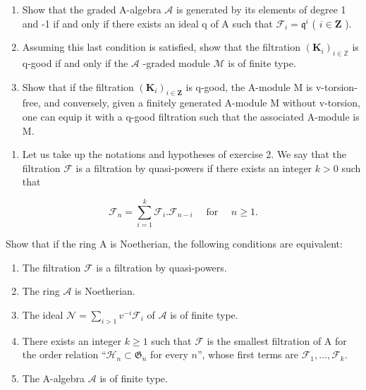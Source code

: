 \begin{enumerate}
\def\labelenumi{\alph{enumi})}
\setcounter{enumi}{1}
\item
  Show that the graded A-algebra \(\mathcal{A}\) is generated by its elements of degree 1 and -1 if and only if there exists an ideal q of A such that \(\mathcal{F}_i = \mathfrak{q}^i\) ( \(i \in \mathbf{Z}\) ).
\item
  Assuming this last condition is satisfied, show that the filtration \((\mathbf{K}_i)_{i\in \mathbb{Z}}\) is q-good if and only if the \(\mathcal{A}\) -graded module \(\mathcal{M}\) is of finite type.
\item
  Show that if the filtration \((\mathbf{K}_{i})_{i\in\mathbf{Z}}\) is q-good, the A-module M is v-torsion-free, and conversely, given a finitely generated A-module M without v-torsion, one can equip it with a q-good filtration such that the associated A-module is M.
\end{enumerate}

\begin{enumerate}
\def\labelenumi{\arabic{enumi})}
\setcounter{enumi}{3}
\tightlist
\item
  Let us take up the notations and hypotheses of exercise 2. We say that the filtration \(\mathcal{F}\) is a filtration by quasi-powers if there exists an integer \(k > 0\) such that
\end{enumerate}

\[
\mathcal {F} _ {n} = \sum_ {i = 1} ^ {k} \mathcal {F} _ {i}. \mathcal {F} _ {n - i} \quad \text { for } \quad n \geqslant 1.
\]

Show that if the ring A is Noetherian, the following conditions are equivalent:

\begin{enumerate}
\def\labelenumi{(\roman{enumi})}
\item
  The filtration \(\mathcal{F}\) is a filtration by quasi-powers.
\item
  The ring \(\mathcal{A}\) is Noetherian.
\item
  The ideal \(\mathcal{N} = \sum_{i > 1} v^{-i}\mathcal{F}_i\) of \(\mathcal{A}\) is of finite type.
\item
  There exists an integer \(k \geqslant 1\) such that \(\mathcal{F}\) is the smallest filtration of A for the order relation “\(\mathcal{H}_n \subset \mathfrak{G}_n\) for every \(n\)”, whose first terms are \(\mathcal{F}_1, ..., \mathcal{F}_k\).
\item
  The A-algebra \(\mathcal{A}\) is of finite type.
\end{enumerate}

